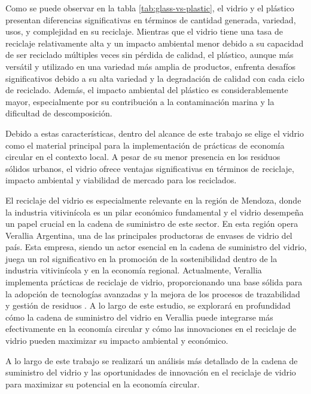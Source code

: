 Como se puede observar en la tabla \ref{tab:glass-vs-plastic}, el vidrio y el plástico presentan diferencias significativas en términos de cantidad generada, variedad, usos, y complejidad en su reciclaje. Mientras que el vidrio tiene una tasa de reciclaje relativamente alta y un impacto ambiental menor debido a su capacidad de ser reciclado múltiples veces sin pérdida de calidad, el plástico, aunque más versátil y utilizado en una variedad más amplia de productos, enfrenta desafíos significativos debido a su alta variedad y la degradación de calidad con cada ciclo de reciclado. Además, el impacto ambiental del plástico es considerablemente mayor, especialmente por su contribución a la contaminación marina y la dificultad de descomposición.

Debido a estas características, dentro del alcance de este trabajo se elige el vidrio como el material principal para la implementación de prácticas de economía circular en el contexto local. A pesar de su menor presencia en los residuos sólidos urbanos, el vidrio ofrece ventajas significativas en términos de reciclaje, impacto ambiental y viabilidad de mercado para los reciclados. 

El reciclaje del vidrio es especialmente relevante en la región de Mendoza, donde la industria vitivinícola es un pilar económico fundamental y el vidrio desempeña un papel crucial en la cadena de suministro de este sector. En esta región opera Verallia Argentina, una de las principales productoras de envases de vidrio del país. Esta empresa, siendo un actor esencial en la cadena de suministro del vidrio, juega un rol significativo en la promoción de la sostenibilidad dentro de la industria vitivinícola y en la economía regional. Actualmente, Verallia implementa prácticas de reciclaje de vidrio, proporcionando una base sólida para la adopción de tecnologías avanzadas y la mejora de los procesos de trazabilidad y gestión de residuos \cite{prodvidrio2024verallia}. A lo largo de este estudio, se explorará en profundidad cómo la cadena de suministro del vidrio en Verallia puede integrarse más efectivamente en la economía circular y cómo las innovaciones en el reciclaje de vidrio pueden maximizar su impacto ambiental y económico.

A lo largo de este trabajo se realizará un análisis más detallado de la cadena de suministro del vidrio y las oportunidades de innovación en el reciclaje de vidrio para maximizar su potencial en la economía circular.
